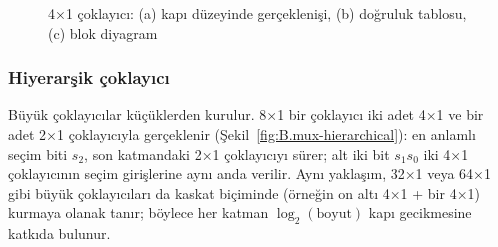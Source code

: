 \begin{figure}[H]
\caption[4×1 çoklayıcı: kapı düzeyi, doğruluk tablosu, blok diyagram]{4×1 çoklayıcı: (a) kapı düzeyinde gerçeklenişi, (b) doğruluk tablosu, (c) blok diyagram}
\label{fig:B.11}
\end{figure}

\subsubsection{Hiyerarşik çoklayıcı}
Büyük çoklayıcılar küçüklerden kurulur. 8×1 bir çoklayıcı iki adet 4×1 ve bir adet 2×1 çoklayıcıyla gerçeklenir (Şekil~\ref{fig:B.mux-hierarchical}): en anlamlı seçim biti $s_2$, son katmandaki 2×1 çoklayıcıyı sürer; alt iki bit $s_1 s_0$ iki 4×1 çoklayıcının seçim girişlerine aynı anda verilir. Aynı yaklaşım, 32×1 veya 64×1 gibi büyük çoklayıcıları da kaskat biçiminde (örneğin on altı 4×1 + bir 4×1) kurmaya olanak tanır; böylece her katman $\log_2(\text{boyut})$ kapı gecikmesine katkıda bulunur.

